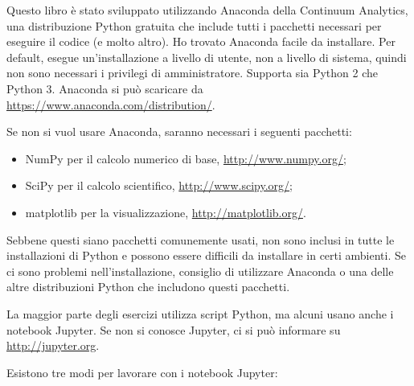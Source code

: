 \documentclass[12pt]{book} \usepackage[width=5.5in,height=8.5in, hmarginratio=3:2,vmarginratio=1:1]{geometry}
\begin{document}
Questo libro è stato sviluppato utilizzando Anaconda della Continuum Analytics, una distribuzione Python gratuita che include tutti i pacchetti necessari per eseguire il codice (e molto altro). Ho trovato Anaconda facile da installare. Per default, esegue un'installazione a livello di utente, non a livello di sistema, quindi non sono necessari i privilegi di amministratore. Supporta sia Python 2 che Python 3. Anaconda si può scaricare da \url{https://www.anaconda.com/distribution/}.  

Se non si vuol usare Anaconda, saranno necessari i seguenti pacchetti:

\begin{itemize} 

\item NumPy per il calcolo numerico di base, \url{http://www.numpy.org/};  

\item SciPy per il calcolo scientifico, \url{http://www.scipy.org/};  

\item matplotlib per la visualizzazione, \url{http://matplotlib.org/}.  

\end{itemize} 

Sebbene questi siano pacchetti comunemente usati, non sono inclusi in tutte le installazioni di Python e possono essere difficili da installare in certi ambienti. Se ci sono problemi nell'installazione, consiglio di utilizzare Anaconda o una delle altre distribuzioni Python che includono questi pacchetti.  

La maggior parte degli esercizi utilizza script Python, ma alcuni usano anche i notebook Jupyter. Se non si conosce Jupyter, ci si può informare su \url{http://jupyter.org}.  

Esistono tre modi per lavorare con i notebook Jupyter:
\end{document}
